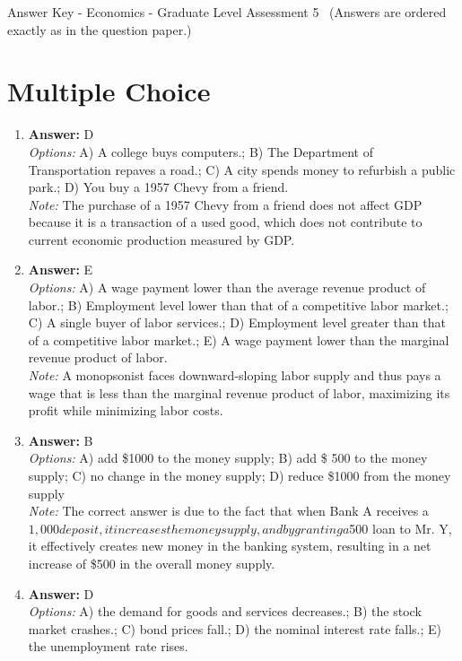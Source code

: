 \documentclass[12pt]{article}
\begin{document}
\begin{center}
Answer Key - Economics - Graduate Level Assessment 5 \
\small (Answers are ordered exactly as in the question paper.)
\end{center}

\section*{Multiple Choice}
\begin{enumerate}[label=\arabic*.]
\item \textbf{Answer:} D
\\ \textit{Options:} A) A college buys computers.; B) The Department of Transportation repaves a road.; C) A city spends money to refurbish a public park.; D) You buy a 1957 Chevy from a friend.
\\ \textit{Note:} The purchase of a 1957 Chevy from a friend does not affect GDP because it is a transaction of a used good, which does not contribute to current economic production measured by GDP.
\item \textbf{Answer:} E
\\ \textit{Options:} A) A wage payment lower than the average revenue product of labor.; B) Employment level lower than that of a competitive labor market.; C) A single buyer of labor services.; D) Employment level greater than that of a competitive labor market.; E) A wage payment lower than the marginal revenue product of labor.
\\ \textit{Note:} A monopsonist faces downward-sloping labor supply and thus pays a wage that is less than the marginal revenue product of labor, maximizing its profit while minimizing labor costs.
\item \textbf{Answer:} B
\\ \textit{Options:} A) add \$1000 to the money supply; B) add \$ 500 to the money supply; C) no change in the money supply; D) reduce \$1000 from the money supply
\\ \textit{Note:} The correct answer is due to the fact that when Bank A receives a $1,000 deposit, it increases the money supply, and by granting a $500 loan to Mr. Y, it effectively creates new money in the banking system, resulting in a net increase of \$500 in the overall money supply.
\item \textbf{Answer:} D
\\ \textit{Options:} A) the demand for goods and services decreases.; B) the stock market crashes.; C) bond prices fall.; D) the nominal interest rate falls.; E) the unemployment rate rises.

\end{enumerate}
\end{document}
